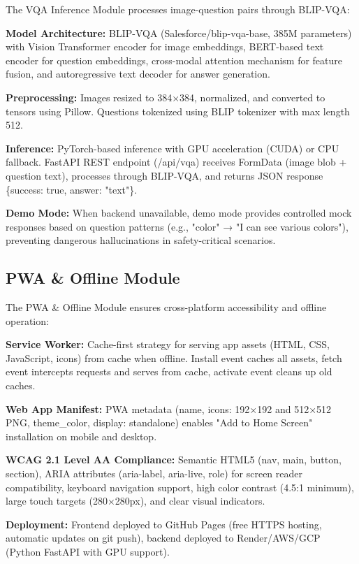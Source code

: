 \documentclass[conference]{IEEEtran}
\begin{document}
The VQA Inference Module processes image-question pairs through BLIP-VQA:

\textbf{Model Architecture:} BLIP-VQA (Salesforce/blip-vqa-base, 385M parameters) with Vision Transformer encoder for image embeddings, BERT-based text encoder for question embeddings, cross-modal attention mechanism for feature fusion, and autoregressive text decoder for answer generation.

\textbf{Preprocessing:} Images resized to 384×384, normalized, and converted to tensors using Pillow. Questions tokenized using BLIP tokenizer with max length 512.

\textbf{Inference:} PyTorch-based inference with GPU acceleration (CUDA) or CPU fallback. FastAPI REST endpoint (/api/vqa) receives FormData (image blob + question text), processes through BLIP-VQA, and returns JSON response \{success: true, answer: "text"\}.

\textbf{Demo Mode:} When backend unavailable, demo mode provides controlled mock responses based on question patterns (e.g., "color" → "I can see various colors"), preventing dangerous hallucinations in safety-critical scenarios.

\subsection{PWA \& Offline Module}

The PWA \& Offline Module ensures cross-platform accessibility and offline operation:

\textbf{Service Worker:} Cache-first strategy for serving app assets (HTML, CSS, JavaScript, icons) from cache when offline. Install event caches all assets, fetch event intercepts requests and serves from cache, activate event cleans up old caches.

\textbf{Web App Manifest:} PWA metadata (name, icons: 192×192 and 512×512 PNG, theme\_color, display: standalone) enables "Add to Home Screen" installation on mobile and desktop.

\textbf{WCAG 2.1 Level AA Compliance:} Semantic HTML5 (nav, main, button, section), ARIA attributes (aria-label, aria-live, role) for screen reader compatibility, keyboard navigation support, high color contrast (4.5:1 minimum), large touch targets (280×280px), and clear visual indicators.

\textbf{Deployment:} Frontend deployed to GitHub Pages (free HTTPS hosting, automatic updates on git push), backend deployed to Render/AWS/GCP (Python FastAPI with GPU support).
\end{document}
